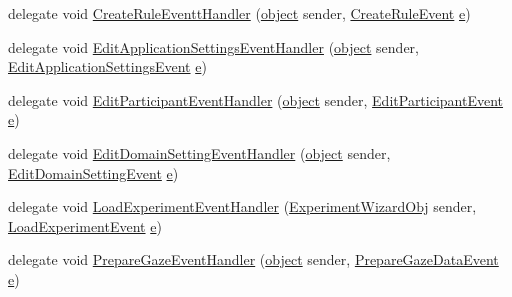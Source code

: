 \begin{DoxyCompactItemize}
\item 
delegate void \hyperlink{namespace_web_analyzer_1_1_events_a411dcf2260875859f1e6d4b3c3e3b46b}{Create\+Rule\+Eventt\+Handler} (\hyperlink{_u_i_2_h_t_m_l_resources_2js_2lib_2underscore_8min_8js_aae18b7515bb2bc4137586506e7c0c903}{object} sender, \hyperlink{class_web_analyzer_1_1_events_1_1_create_rule_event}{Create\+Rule\+Event} \hyperlink{_u_i_2_h_t_m_l_resources_2js_2lib_2bootstrap_8min_8js_ab5902775854a8b8440bcd25e0fe1c120}{e})
\item 
delegate void \hyperlink{namespace_web_analyzer_1_1_events_a5fea12ab57b4d49c98080dae8ae699a6}{Edit\+Application\+Settings\+Event\+Handler} (\hyperlink{_u_i_2_h_t_m_l_resources_2js_2lib_2underscore_8min_8js_aae18b7515bb2bc4137586506e7c0c903}{object} sender, \hyperlink{class_web_analyzer_1_1_events_1_1_edit_application_settings_event}{Edit\+Application\+Settings\+Event} \hyperlink{_u_i_2_h_t_m_l_resources_2js_2lib_2bootstrap_8min_8js_ab5902775854a8b8440bcd25e0fe1c120}{e})
\item 
delegate void \hyperlink{namespace_web_analyzer_1_1_events_a3259c67827e152226cea5a7ddbb8ce99}{Edit\+Participant\+Event\+Handler} (\hyperlink{_u_i_2_h_t_m_l_resources_2js_2lib_2underscore_8min_8js_aae18b7515bb2bc4137586506e7c0c903}{object} sender, \hyperlink{class_web_analyzer_1_1_events_1_1_edit_participant_event}{Edit\+Participant\+Event} \hyperlink{_u_i_2_h_t_m_l_resources_2js_2lib_2bootstrap_8min_8js_ab5902775854a8b8440bcd25e0fe1c120}{e})
\item 
delegate void \hyperlink{namespace_web_analyzer_1_1_events_a5fed3a7653709d0b4bd898915c660916}{Edit\+Domain\+Setting\+Event\+Handler} (\hyperlink{_u_i_2_h_t_m_l_resources_2js_2lib_2underscore_8min_8js_aae18b7515bb2bc4137586506e7c0c903}{object} sender, \hyperlink{class_web_analyzer_1_1_events_1_1_edit_domain_setting_event}{Edit\+Domain\+Setting\+Event} \hyperlink{_u_i_2_h_t_m_l_resources_2js_2lib_2bootstrap_8min_8js_ab5902775854a8b8440bcd25e0fe1c120}{e})
\item 
delegate void \hyperlink{namespace_web_analyzer_1_1_events_a13d6989d83a09589cd3e1012c644fcfc}{Load\+Experiment\+Event\+Handler} (\hyperlink{class_web_analyzer_1_1_u_i_1_1_interaction_objects_1_1_experiment_wizard_obj}{Experiment\+Wizard\+Obj} sender, \hyperlink{class_web_analyzer_1_1_events_1_1_load_experiment_event}{Load\+Experiment\+Event} \hyperlink{_u_i_2_h_t_m_l_resources_2js_2lib_2bootstrap_8min_8js_ab5902775854a8b8440bcd25e0fe1c120}{e})
\item 
delegate void \hyperlink{namespace_web_analyzer_1_1_events_a871ece28a52add18a0e49e988aae2444}{Prepare\+Gaze\+Event\+Handler} (\hyperlink{_u_i_2_h_t_m_l_resources_2js_2lib_2underscore_8min_8js_aae18b7515bb2bc4137586506e7c0c903}{object} sender, \hyperlink{class_web_analyzer_1_1_events_1_1_prepare_gaze_data_event}{Prepare\+Gaze\+Data\+Event} \hyperlink{_u_i_2_h_t_m_l_resources_2js_2lib_2bootstrap_8min_8js_ab5902775854a8b8440bcd25e0fe1c120}{e})

\end{DoxyCompactItemize}
